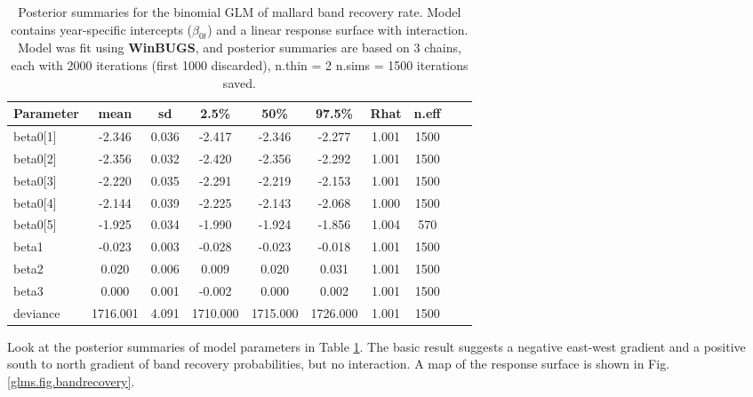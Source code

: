 {{{\begin{table}
\caption{Posterior summaries for the binomial GLM of mallard band
  recovery rate.  Model contains year-specific intercepts
  ($\beta_{0t}$) and a linear response surface with interaction. 
Model was fit using {\bf WinBUGS}, and posterior summaries are based 
on 3 chains, each with 2000 iterations (first 1000 discarded), n.thin = 2
 n.sims = 1500 iterations saved.
   }
   \scriptsize
  \begin{tabular}{lccccccccc}
    \hline
        \hline
 Parameter &    mean   & sd   &  2.5\%   &    50\%   &   97.5\% & Rhat & n.eff \\
     \hline
beta0[1] &  -2.346& 0.036&   -2.417&   -2.346&   -2.277& 1.001&  1500\\
beta0[2] &  -2.356& 0.032&   -2.420&   -2.356&   -2.292& 1.001&  1500\\
beta0[3] &  -2.220& 0.035&   -2.291&   -2.219&   -2.153& 1.001&  1500\\
beta0[4] &  -2.144& 0.039&   -2.225&   -2.143&   -2.068& 1.000&  1500\\
beta0[5] &  -1.925& 0.034&   -1.990&   -1.924&   -1.856& 1.004&   570\\
beta1    &  -0.023& 0.003&   -0.028&   -0.023&   -0.018& 1.001&  1500\\
beta2    &   0.020& 0.006&    0.009&    0.020&    0.031& 1.001&  1500\\
beta3    &   0.000& 0.001&   -0.002&    0.000&    0.002& 1.001&  1500\\
deviance &1716.001& 4.091& 1710.000&  1715.000&  1726.000& 1.001&  1500\\
    \hline
  \end{tabular}
  \label{glms.tab.mallard}
\vspace{0.5cm}
\end{table}



Look at the posterior summaries of model parameters in Table
\ref{glms.tab.mallard}. The basic result suggests a negative east-west
gradient and a positive south to north gradient of band recovery
probabilities, but no interaction. A map of the response surface is
shown in Fig. \ref{glms.fig.bandrecovery}.


}}}
